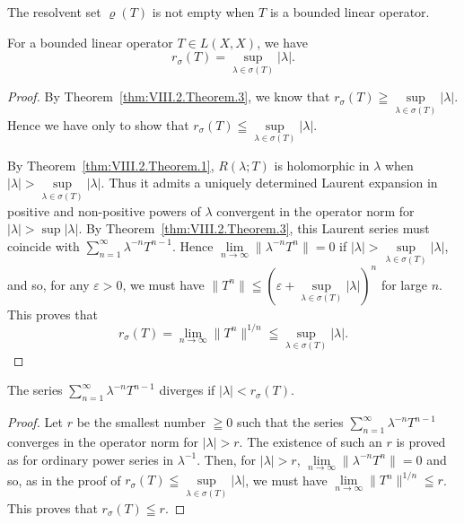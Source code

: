 \begin{corollaryu} The resolvent set $\varrho(T)$ is not empty when $T$ is a bounded linear operator. 
\end{corollaryu}

\begin{theorem}\label{thm:VIII.2.Theorem.4} For a bounded linear operator $T \in L(X, X)$, we have 
\begin{equation}\label{eq:VIII.2.6}
r _{\sigma} (T) = \sup\limits _{\lambda \in \sigma (T)} | \lambda |.
\end{equation}
\end{theorem}

\begin{proof}
 By Theorem~\ref{thm:VIII.2.Theorem.3}, we know that $r_{\sigma}(T) \geqq \sup\limits_{\lambda \in \sigma(T)} |\lambda|$. Hence we have only to show that $r_{\sigma}(T) \leqq \sup\limits_{\lambda \in \sigma(T)} |\lambda|$. 

By Theorem~\ref{thm:VIII.2.Theorem.1}, $R(\lambda; T)$ is holomorphic in $\lambda$ when $|\lambda| > \sup\limits_{\lambda \in \sigma(T)} |\lambda|$. Thus it admits a uniquely determined Laurent expansion in positive and non-positive powers of $\lambda$ convergent in the operator norm for $|\lambda| > \sup |\lambda|$. By Theorem~\ref{thm:VIII.2.Theorem.3}, this Laurent series must coincide with $\sum\limits_{n=1}^{\infty} \lambda^{-n} T^{n-1}$. Hence $\lim\limits_{n \to \infty} \|\lambda^{-n} T^n\| = 0$ if $|\lambda| > \sup\limits_{\lambda \in \sigma(T)} |\lambda|$, and so, for any $\varepsilon > 0$, we must have $\|T^n\| \leqq (\varepsilon + \sup\limits_{\lambda \in \sigma(T)} |\lambda|)^n$ for large $n$. This proves that 
\[
r _{\sigma} (T) = \lim\limits _{n \rightarrow \infty} \| T ^{n} \| ^{1/n} \leqq \sup\limits _{\lambda \in \sigma (T)} | \lambda |.
\]
\end{proof}

\begin{corollaryu} The series $\sum\limits_{n=1}^{\infty} \lambda^{-n} T^{n-1}$ diverges if $|\lambda| < r_{\sigma}(T)$. 
\end{corollaryu}

\begin{proof}
 Let $r$ be the smallest number $\geqq 0$ such that the series $\sum\limits_{n=1}^{\infty} \lambda^{-n} T^{n-1}$ converges in the operator norm for $|\lambda| > r$. The existence of such an $r$ is proved as for ordinary power series in $\lambda^{-1}$. Then, for $|\lambda| > r$, $\lim\limits_{n \to \infty} \|\lambda^{-n} T^n\| = 0$ and so, as in the proof of $r_\sigma(T) \leqq \sup\limits_{\lambda \in \sigma(T)} |\lambda|$, we must have $\lim\limits_{n \to \infty} \|T^n\|^{1/n} \leqq r$. This proves that $r_\sigma(T) \leqq r$. 
\end{proof}


